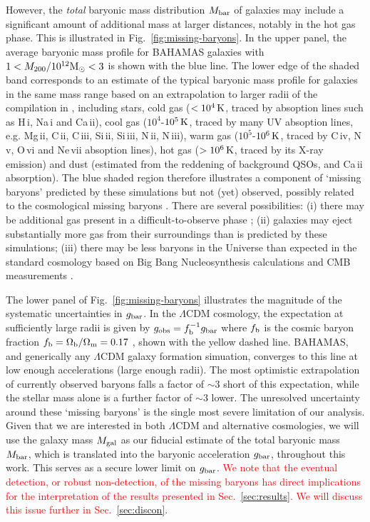 \documentclass[usenatbib]{mnras}
\newcommand{\un}[1]{_{\rm #1}}
\begin{document}
However, the \emph{total} baryonic mass distribution $M\un{bar}$ of galaxies may include a significant amount of additional mass at larger distances, notably in the hot gas phase. This is illustrated in Fig.~\ref{fig:missing-baryons}. In the upper panel, the average baryonic mass profile for BAHAMAS galaxies with $1<M_{200}/10^{12}{\rm M}_\odot<3$ is shown with the blue line. The lower edge of the shaded band corresponds to an estimate of the typical baryonic mass profile for galaxies in the same mass range based on an extrapolation to larger radii of the compilation in \citet{tumlinson2017}, including stars, cold gas ($<10^4\,{\rm K}$, traced by absoption lines such as H\,{\sc i}, Na\,{\sc i} and Ca\,{\sc ii}), cool gas ($10^4$-$10^5\,{\rm K}$, traced by many UV absoption lines, e.g. Mg\,{\sc ii}, C\,{\sc ii}, C\,{\sc iii}, Si\,{\sc ii}, Si\,{\sc iii}, N\,{\sc ii}, N\,{\sc iii}), warm gas ($10^5$-$10^6\,{\rm K}$, traced by C\,{\sc iv}, N\,{\sc v}, O\,{\sc vi} and Ne\,{\sc vii} absoption lines), hot gas ($>10^6\,{\rm K}$, traced by its X-ray emission) and dust (estimated from the reddening of background QSOs, and Ca\,{\sc ii} absorption). The blue shaded region therefore illustrates a component of `missing baryons' predicted by these simulations but not (yet) observed, possibly related to the cosmological missing baryons \citep[e.g.][]{fukugita1998,fukugita2004,shull2012}. There are several possibilities: (i) there may be additional gas present in a difficult-to-observe phase \citep[e.g. hot, low-density gas, see for instance][]{nicastro2018}; (ii) galaxies may eject substantially more gas from their surroundings than is predicted by these simulations; (iii) there may be less baryons in the Universe than expected in the standard cosmology based on Big Bang Nucleosynthesis \cite[BBN,][]{kirkman2003} calculations and CMB measurements \cite[]{spergel2003,planck2014}.

The lower panel of Fig.~\ref{fig:missing-baryons} illustrates the magnitude of the systematic uncertainties in $g_{\rm bar}$. In the $\Lambda$CDM cosmology, the expectation at sufficiently large radii is given by $g\un{obs}=f^{-1}\un{b} g\un{bar}$ where $f\un b$ is the cosmic baryon fraction $f\un{b} = \Omega\un{b}/\Omega\un{m} = 0.17$ \cite[]{hinshaw2013}, shown with the yellow dashed line. BAHAMAS, and generically any $\Lambda$CDM galaxy formation simuation, converges to this line at low enough accelerations (large enough radii). The most optimistic extrapolation of currently observed baryons falls a factor of $\sim 3$ short of this expectation, while the stellar mass alone is a further factor of $\sim 3$ lower. The unresolved uncertainty around these `missing baryons' is the single most severe limitation of our analysis. Given that we are interested in both $\Lambda$CDM and alternative cosmologies, we will use the galaxy mass $M\un{gal}$ as our fiducial estimate of the total baryonic mass $M\un{bar}$, which is translated into the baryonic acceleration $g\un{bar}$, throughout this work. This serves as a secure lower limit on $g\un{bar}$. \textcolor{red}{We note that the eventual detection, or robust non-detection, of the missing baryons has direct implications for the interpretation of the results presented in Sec.~\ref{sec:results}. We will discuss this issue further in Sec.~\ref{sec:discon}}.
\end{document}
